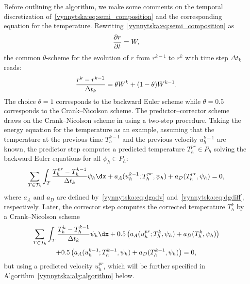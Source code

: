 Before outlining the algorithm, we make some comments on the temporal
discretization of~\eqref{vynnytska:eq:semi_composition}
and the corresponding equation for the
temperature. Rewriting~\eqref{vynnytska:eq:semi_composition} as\vspace*{-1pt}
\begin{equation}
  \frac{\partial r}{\partial t} = W,
  \vspace*{-1pt}
\end{equation}
the common $\theta$-scheme for the evolution of $r$ from $r^{k-1}$ to
$r^k$ with time step $\Delta t_k$ reads:\vspace*{-1pt}
\begin{equation}
  \label{vynnytska:eq:thetascheme}
  \frac{r^k - r^{k-1}}{\Delta t_k} = \theta W^k + (1 - \theta) W^{k-1}.
  \vspace*{-1pt}
\end{equation}
The choice $\theta = 1$ corresponds to the backward Euler scheme
while $\theta = 0.5$ corresponds to the Crank--Nicolson scheme. The
predictor--corrector scheme draws on the Crank--Nicolson scheme in using a
two-step procedure. Taking the energy equation for the temperature as an
example, assuming that the temperature at the previous time $T_h^{k-1}$
and the previous velocity $u_h^{k-1}$ are known, the predictor step
computes a predicted temperature $T_h^{pr} \in P_h$ solving the backward
Euler equations for all $\psi_h \in P_h$:
\begin{equation}
  \label{vynnytska:eq:predictor}
  \sum_{T \in \mathcal{T}_h}
  \int_T \frac{T_h^{pr} - T_h^{k-1}}{\Delta t_k} \psi_h \dx
  + a_{A} (u_h^{k-1}; T_h^{pr}, \psi_h) + a_D (T_h^{pr}, \psi_h) = 0,
\end{equation}
where $a_A$ and $a_D$ are defined by~\eqref{vynnytska:eq:dgadv}
and~\eqref{vynnytska:eq:dgdiff}, respectively. Later, the corrector
step computes the corrected temperature $T_h^k$ by a Crank--Nicolson
scheme
\begin{multline}
  \label{vynnytska:eq:corrector}
    \sum_{T \in \mathcal{T}_h}
    \int_T \frac{T_h^k - T_h^{k-1}}{\Delta t_k} \psi_h \dx
    + 0.5 \left( a_{A} (u_h^{pr}; T_h^{k}, \psi_h)
    + a_D (T_h^{k}, \psi_h) \right)
\\
    + 0.5 \left( a_{A} (u_h^{k-1}; T_h^{k-1}, \psi_h)
    + a_D (T_h^{k-1}, \psi_h) \right) = 0,
\end{multline}
but using a predicted velocity $u_h^{pr}$, which will be further
specified in Algorithm~\ref{vynnytska:alg:algorithm}
below.
